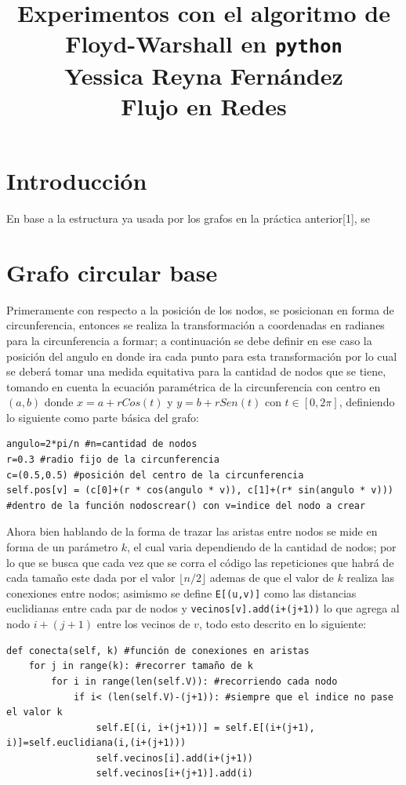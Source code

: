 \documentclass[12pt]{article}
\begin{document}
\title{{\LARGE \textbf{Experimentos con el algoritmo de Floyd-Warshall en \texttt{python}}}\\ {\large Yessica Reyna Fernández}\\{\large Flujo en Redes}}
\maketitle
\section{Introducción}
En base a la estructura ya usada por los grafos en la práctica anterior[1], se 
\section{Grafo circular base}
Primeramente con respecto a la posición de los nodos, se posicionan en forma de circunferencia, entonces se realiza la transformación a coordenadas en radianes para la circunferencia a formar; a continuación se debe definir en ese caso la posición del angulo en donde ira cada punto para esta transformación por lo cual se deberá tomar una medida equitativa para la cantidad de nodos que se tiene, tomando en cuenta la ecuación paramétrica de la circunferencia con centro en $(a,b)$ donde $x=a+rCos(t)$ y $y=b+rSen(t)$ con $t\in[0,2\pi]$, definiendo lo siguiente como parte básica del grafo:
\begin{lstlisting}[style=tt]
angulo=2*pi/n #n=cantidad de nodos
r=0.3 #radio fijo de la circunferencia
c=(0.5,0.5) #posición del centro de la circunferencia
self.pos[v] = (c[0]+(r * cos(angulo * v)), c[1]+(r* sin(angulo * v))) #dentro de la función nodoscrear() con v=indice del nodo a crear
\end{lstlisting}
Ahora bien hablando de la forma de trazar las aristas entre nodos se mide en forma de un parámetro $k$, el cual varia dependiendo de la cantidad de nodos; por lo que se busca que cada vez que se corra el código las repeticiones que habrá de cada tamaño este dada por el valor $ \lfloor n/2 \rfloor $ ademas de que el valor de $k$ realiza las conexiones entre nodos; asimismo se define \texttt{E[(u,v)]} como las distancias euclidianas entre cada par de nodos y \texttt{vecinos[v].add(i+(j+1))} lo que agrega al nodo $i+(j+1)$  entre los vecinos de $v$, todo esto descrito en lo siguiente:
\begin{lstlisting}[style=tt]
def conecta(self, k) #función de conexiones en aristas
	for j in range(k): #recorrer tamaño de k
		for i in range(len(self.V)): #recorriendo cada nodo
			if i< (len(self.V)-(j+1)): #siempre que el indice no pase el valor k
				self.E[(i, i+(j+1))] = self.E[(i+(j+1), i)]=self.euclidiana(i,(i+(j+1)))
				self.vecinos[i].add(i+(j+1))
				self.vecinos[i+(j+1)].add(i)
\end{lstlisting}
\end{document}
